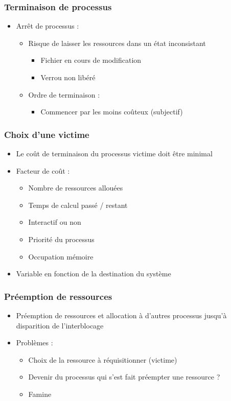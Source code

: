 \begin{frame}
\frametitle{Terminaison de processus}
\begin{itemize}
\item Arrêt de processus :
\begin{itemize}
\item Risque de laisser les ressources dans un état inconsistant
\begin{itemize}
\item Fichier en cours de modification
\item Verrou non libéré
\end{itemize}
\item Ordre de terminaison :
\begin{itemize}
\item Commencer par les moins coûteux (subjectif)
\end{itemize}
\end{itemize}
\end{itemize}
\end{frame}

\begin{frame}
\frametitle{Choix d’une victime}
\begin{itemize}
\item <1->Le coût de terminaison du processus victime doit être minimal
\item <2->Facteur de coût :
\begin{itemize}
\item Nombre de ressources allouées
\item Temps de calcul passé / restant
\item Interactif ou non
\item Priorité du processus
\item Occupation mémoire
\end{itemize}
\item <3->Variable en fonction de la destination du système
\end{itemize}
\end{frame}

\begin{frame}
\frametitle{Préemption de ressources}
\begin{itemize}
\item <1->Préemption de ressources et allocation à d’autres processus jusqu’à disparition de l’interblocage
\item <2->Problèmes :
\begin{itemize}
\item Choix de la ressource à réquisitionner (victime)
\item Devenir du processus qui s’est fait préempter une ressource ?
\item Famine
\end{itemize}
\end{itemize}
\end{frame}

